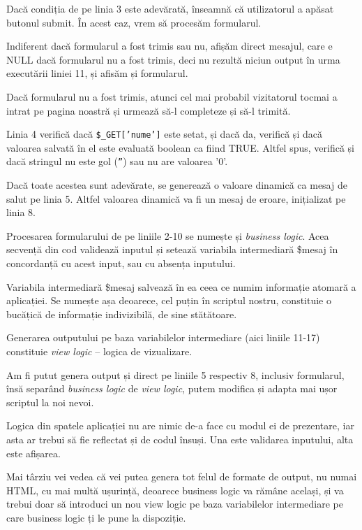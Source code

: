 Dacă condiția de pe linia 3 este adevărată, înseamnă că utilizatorul a apăsat
butonul {\glqq}submit{\grqq}. În acest caz, vrem să procesăm formularul.

Indiferent
dacă formularul a fost trimis sau nu, 
afișăm direct mesajul, care e NULL dacă formularul nu a fost trimis, deci nu rezultă niciun output în
urma executării liniei 11, și afisăm și formularul.

Dacă formularul nu a fost trimis, atunci cel mai probabil vizitatorul tocmai a intrat
pe pagina noastră și urmează să-l completeze și să-l trimită.

Linia 4 verifică dacă \texttt{\$\_GET['nume']} este setat, și dacă da, verifică
și dacă valoarea salvată în el este evaluată boolean ca fiind TRUE. Altfel spus,
verifică și dacă stringul nu este gol (\texttt{''}) sau nu are valoarea '0'.

Dacă toate acestea sunt adevărate, se generează o valoare dinamică ca mesaj de salut pe linia 5.
Altfel valoarea dinamică va fi un mesaj de eroare, inițializat pe linia 8.

Procesarea formularului de pe liniile 2-10 se numește și \textsl{business logic}.
Acea secvență
din cod validează inputul și setează variabila intermediară \$mesaj în concordanță
cu acest input, sau cu absența inputului.

Variabila intermediară \$mesaj salvează în ea ceea ce numim {\glqq}informație atomară a aplicației{\grqq}.
Se numește așa deoarece, cel puțin în scriptul nostru, constituie o bucățică de informație
indivizibilă, de sine stătătoare.

Generarea outputului pe baza variabilelor intermediare (aici liniile 11-17) constituie
\textsl{view logic} -- logica de vizualizare.

Am fi putut genera output și direct pe liniile 5 respectiv 8, inclusiv formularul,
însă separând \textsl{business logic} de \textsl{view logic},
putem modifica și adapta mai ușor scriptul la noi nevoi.

Logica din spatele aplicației nu are nimic de-a face cu modul ei de prezentare, iar
asta ar trebui să fie reflectat și de codul însuși. Una este validarea inputului,
alta este afișarea.

Mai târziu vei vedea că vei putea genera tot felul de formate de output, nu numai HTML,
cu mai multă ușurință, deoarece business logic va rămâne același, și va trebui
doar să introduci un nou view logic pe baza variabilelor intermediare pe care business logic
ți le pune la dispoziție.

